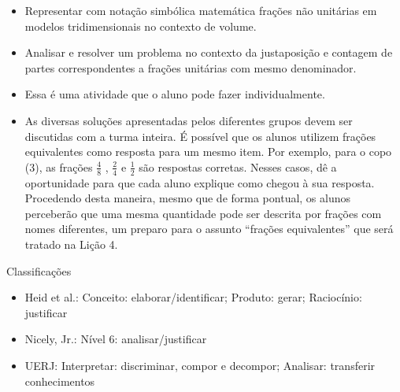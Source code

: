 \begin{multicols}{2}
   \vspace{.1cm}

  \begin{itemize} %
    \item       Representar com notação simbólica matemática frações não unitárias em modelos tridimensionais no contexto de volume.
    \item       Analisar e resolver um problema no contexto da justaposição e contagem de partes correspondentes a frações unitárias com mesmo denominador.
\end{itemize} %


  \vspace{.1cm}
  
    \vspace{.1cm}

    \begin{itemize} %
    \item       Essa é uma atividade que o aluno pode fazer individualmente.
    \item       As diversas soluções apresentadas pelos diferentes grupos devem ser discutidas com a turma inteira. É possível que os alunos utilizem frações equivalentes como resposta para um mesmo item. Por exemplo, para o copo (3), as frações       $\frac{4}{8}$      ,       $\frac{2}{4}$       e       $\frac{1}{2}$       são respostas corretas. Nesses casos, dê a oportunidade para que cada aluno explique como chegou à sua resposta. Procedendo desta maneira, mesmo que de forma pontual, os alunos perceberão que uma mesma quantidade pode ser descrita por frações com nomes diferentes, um preparo para o assunto       ``frações equivalentes''       que será tratado na Lição 4.
\end{itemize} %


  Classificações
\begin{itemize} %
    \item       Heid et al.: Conceito: elaborar/identificar; Produto: gerar; Raciocínio: justificar
    \item       Nicely, Jr.: Nível 6: analisar/justificar
    \item       UERJ: Interpretar: discriminar, compor e decompor; Analisar: transferir conhecimentos
\end{itemize} %



\end{multicols}
